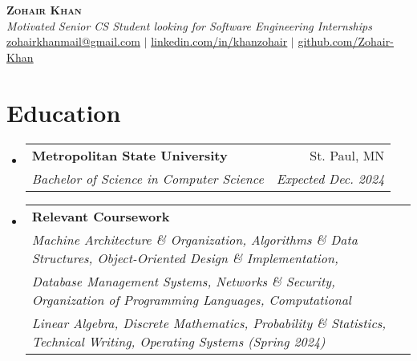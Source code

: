 \documentclass[letterpaper,11pt]{article}
\makeatletter
\newcommand{\resumeSubheading}[4]{
  \vspace{-1pt}\item
    \begin{tabular*}{0.97\textwidth}{l@{\extracolsep{\fill}}r}
      \textbf{#1} & #2 \\
      \textit{\small#3} & \textit{\small #4} \\
    \end{tabular*}\vspace{-5pt}
}
\newcommand{\resumeCoursework}[4]{
  \vspace{-1pt}\item
    \begin{tabular*}{0.97\textwidth}{l@{\extracolsep{\fill}}r}
      \textbf{#1}\\
      \textit{\small#2} \\
      \textit{\small #3} \\
      \textit{\small #4} \\
    \end{tabular*}\vspace{-5pt}
}
\newcommand{\resumeSubHeadingListStart}{\begin{itemize}[leftmargin=*]}
\newcommand{\resumeSubHeadingListEnd}{\end{itemize}}
\makeatother
\begin{document}
  

\begin{center}
    \textbf{\Huge \scshape Zohair Khan} \\ \vspace{1pt}
    \textit{Motivated Senior CS Student looking for Software Engineering Internships} \\
    \small \href{mailto:zohairkhanmail@gmail.com}{\underline{zohairkhanmail@gmail.com}} $|$ 
    \href{https://www.linkedin.com/in/khanzohair/}{\underline{linkedin.com/in/khanzohair}} $|$
    \href{https://github.com/Zohair-Khan}{\underline{github.com/Zohair-Khan}} 
\end{center} \vspace{-15pt}


\section{Education}
  \resumeSubHeadingListStart
    \resumeSubheading
      {Metropolitan State University}{St. Paul, MN}
      {Bachelor of Science in Computer Science}{Expected Dec. 2024}
    \resumeCoursework
      {Relevant Coursework}
      {Machine Architecture \& Organization, Algorithms \& Data Structures, Object-Oriented Design \& Implementation,}
      {Database Management Systems, Networks \& Security, Organization of Programming Languages, Computational }
      {Linear Algebra, Discrete Mathematics, Probability \& Statistics, Technical Writing, Operating Systems (Spring 2024)}
  \resumeSubHeadingListEnd 

\end{document}

